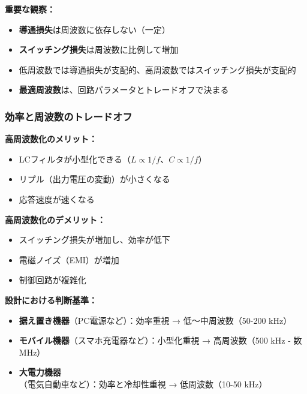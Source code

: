 \begin{screen}
\textbf{重要な観察：}

\begin{itemize}
\item \textbf{導通損失}は周波数に依存しない（一定）
\item \textbf{スイッチング損失}は周波数に比例して増加
\item 低周波数では導通損失が支配的、高周波数ではスイッチング損失が支配的
\item \textbf{最適周波数}は、回路パラメータとトレードオフで決まる
\end{itemize}
\end{screen}

\subsubsection{効率と周波数のトレードオフ}

\begin{screen}
\textbf{高周波数化のメリット：}

\begin{itemize}
\item LCフィルタが小型化できる（$L \propto 1/f$、$C \propto 1/f$）
\item リプル（出力電圧の変動）が小さくなる
\item 応答速度が速くなる
\end{itemize}

\textbf{高周波数化のデメリット：}

\begin{itemize}
\item スイッチング損失が増加し、効率が低下
\item 電磁ノイズ（EMI）が増加
\item 制御回路が複雑化
\end{itemize}

\textbf{設計における判断基準：}

\begin{itemize}
\item \textbf{据え置き機器}（PC電源など）：効率重視 → 低〜中周波数（50-200 kHz）
\item \textbf{モバイル機器}（スマホ充電器など）：小型化重視 → 高周波数（500 kHz - 数MHz）
\item \textbf{大電力機器}（電気自動車など）：効率と冷却性重視 → 低周波数（10-50 kHz）
\end{itemize}
\end{screen}

